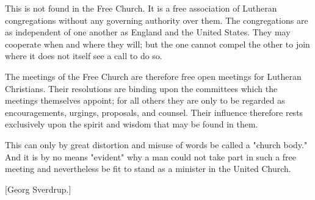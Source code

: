 This is not found in the Free Church. It is a free association of Lutheran congregations without any governing authority over them. The congregations are as independent of one another as England and the United States. They may cooperate when and where they will; but the one cannot compel the other to join where it does not itself see a call to do so.

The meetings of the Free Church are therefore free open meetings for Lutheran Christians. Their resolutions are binding upon the committees which the meetings themselves appoint; for all others they are only to be regarded as encouragements, urgings, proposals, and counsel. Their influence therefore rests exclusively upon the spirit and wisdom that may be found in them.

This can only by great distortion and misuse of words be called a "church body." And it is by no means "evident" why a man could not take part in such a free meeting and nevertheless be fit to stand as a minister in the United Church.

[Georg Sverdrup.]
